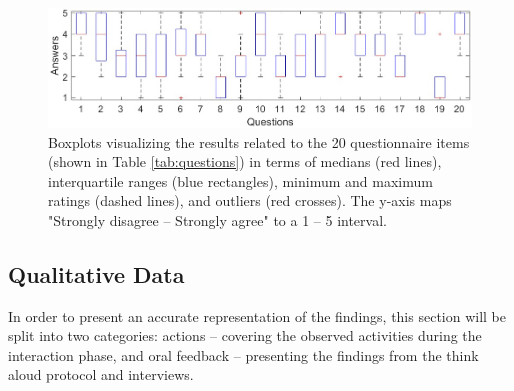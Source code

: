\documentclass[dvipsnames, pdftex]{article}
\begin{document}
\begin{figure}[!t]
    \centering
    \includegraphics[width=1.0\textwidth]{SMC 2020 paper template LaTeX/figures/Boxplots.jpg}
    \caption{Boxplots visualizing the results related to the 20 questionnaire items (shown in Table \ref{tab:questions}) in terms of medians (red lines), interquartile ranges (blue rectangles), minimum and maximum ratings (dashed lines), and outliers (red crosses). The y-axis maps "Strongly disagree -- Strongly agree" to a 1 -- 5 interval.}
    \label{fig:boxplots}
\end{figure}

\subsection{Qualitative Data}
In order to present an accurate representation of the findings, this section will be split into two categories: actions -- covering the observed activities during the interaction phase, and oral feedback -- presenting the findings from the think aloud protocol and interviews.
\end{document}
